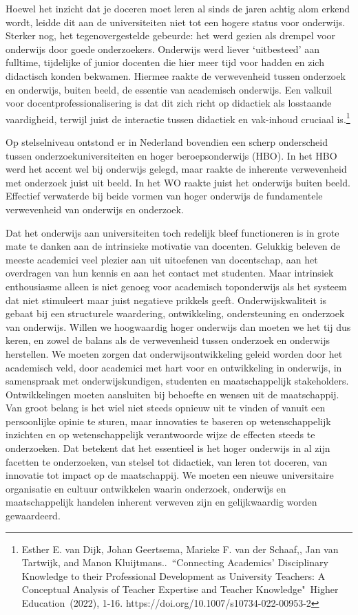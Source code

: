\documentclass[empirical, authordate, ]{new-jote-article}
\begin{document}
	Hoewel het inzicht dat je doceren moet leren al sinds de jaren achtig alom erkend wordt, leidde dit aan de universiteiten niet tot een hogere status voor onderwijs. Sterker nog, het tegenovergestelde gebeurde: het werd gezien als drempel voor onderwijs door goede onderzoekers. Onderwijs werd liever ‘uitbesteed' aan fulltime, tijdelijke of junior docenten die hier meer tijd voor hadden en zich didactisch konden bekwamen. Hiermee raakte de verwevenheid tussen onderzoek en onderwijs, buiten beeld, de essentie van academisch onderwijs. Een valkuil voor docentprofessionalisering is dat dit zich richt op didactiek als losstaande vaardigheid, terwijl juist de interactie tussen didactiek en vak-inhoud cruciaal is.\footnote{Esther E. van Dijk, Johan Geertsema, Marieke F. van der Schaaf,, Jan van Tartwijk, and Manon Kluijtmans.. “Connecting Academics' Disciplinary Knowledge to their Professional Development as University Teachers: A Conceptual Analysis of Teacher Expertise and Teacher Knowledge" Higher Education (2022), 1-16. https://doi.org/10.1007/s10734-022-00953-2}



	 Op stelselniveau ontstond er in Nederland bovendien een scherp onderscheid tussen onderzoekuniversiteiten en hoger beroepsonderwijs (HBO). In het HBO werd het accent wel bij onderwijs gelegd, maar raakte de inherente verwevenheid met onderzoek juist uit beeld. In het WO raakte juist het onderwijs buiten beeld. Effectief verwaterde bij beide vormen van hoger onderwijs de fundamentele verwevenheid van onderwijs en onderzoek.



	Dat het onderwijs aan universiteiten toch redelijk bleef functioneren is in grote mate te danken aan de intrinsieke motivatie van docenten. Gelukkig beleven de meeste academici veel plezier aan uit uitoefenen van docentschap, aan het overdragen van hun kennis en aan het contact met studenten. Maar intrinsiek enthousiasme alleen is niet genoeg voor academisch toponderwijs als het systeem dat niet stimuleert maar juist negatieve prikkels geeft. Onderwijskwaliteit is gebaat bij een structurele waardering, ontwikkeling, ondersteuning en onderzoek van onderwijs. Willen we hoogwaardig hoger onderwijs dan moeten we het tij dus keren, en zowel de balans als de verwevenheid tussen onderzoek en onderwijs herstellen. We moeten zorgen dat onderwijsontwikkeling geleid worden door het academisch veld, door academici met hart voor en ontwikkeling in onderwijs, in samenspraak met onderwijskundigen, studenten en maatschappelijk stakeholders. Ontwikkelingen moeten aansluiten bij behoefte en wensen uit de maatschappij. Van groot belang is het wiel niet steeds opnieuw uit te vinden of vanuit een persoonlijke opinie te sturen, maar innovaties te baseren op wetenschappelijk inzichten en op wetenschappelijk verantwoorde wijze de effecten steeds te onderzoeken. Dat betekent dat het essentieel is het hoger onderwijs in al zijn facetten te onderzoeken, van stelsel tot didactiek, van leren tot doceren, van innovatie tot impact op de maatschappij. We moeten een nieuwe universitaire organisatie en cultuur ontwikkelen waarin onderzoek, onderwijs en maatschappelijk handelen inherent verweven zijn en gelijkwaardig worden gewaardeerd.
\end{document}
